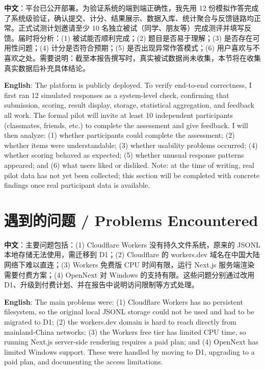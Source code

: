 \documentclass[11pt,a4paper]{ctexart}
\begin{document}
\noindent\textbf{中文}：平台已公开部署。为验证系统的端到端正确性，我先用 12 份模拟作答完成了系统级验证，确认提交、计分、结果展示、数据入库、统计聚合与反馈链路均正常。正式试测计划邀请至少 10 名独立被试（同学、朋友等）完成测评并填写反馈。届时将分析：(1) 被试能否顺利完成；(2) 题目是否易于理解；(3) 是否存在可用性问题；(4) 计分是否符合预期；(5) 是否出现异常作答模式；(6) 用户喜欢与不喜欢之处。需要说明：截至本报告撰写时，真实被试数据尚未收集，本节将在收集真实数据后补充具体结论。

\medskip

\noindent\textbf{English}: The platform is publicly deployed. To verify end-to-end correctness, I first ran 12 simulated responses as a system-level check, confirming that submission, scoring, result display, storage, statistical aggregation, and feedback all work. The formal pilot will invite at least 10 independent participants (classmates, friends, etc.) to complete the assessment and give feedback. I will then analyze: (1) whether participants could complete the assessment; (2) whether items were understandable; (3) whether usability problems occurred; (4) whether scoring behaved as expected; (5) whether unusual response patterns appeared; and (6) what users liked or disliked. Note: at the time of writing, real pilot data has not yet been collected; this section will be completed with concrete findings once real participant data is available.

\section{遇到的问题 / Problems Encountered}

\noindent\textbf{中文}：主要问题包括：(1) Cloudflare Workers 没有持久文件系统，原来的 JSONL 本地存储无法使用，需迁移到 D1；(2) Cloudflare 的 workers.dev 域名在中国大陆网络下难以直连；(3) Workers 免费版 CPU 时间有限，运行 Next.js 服务端渲染需要付费方案；(4) OpenNext 对 Windows 的支持有限。这些问题分别通过改用 D1、升级到付费计划、并在报告中说明访问限制等方式处理。

\medskip

\noindent\textbf{English}: The main problems were: (1) Cloudflare Workers has no persistent filesystem, so the original local JSONL storage could not be used and had to be migrated to D1; (2) the workers.dev domain is hard to reach directly from mainland-China networks; (3) the Workers free tier has limited CPU time, so running Next.js server-side rendering requires a paid plan; and (4) OpenNext has limited Windows support. These were handled by moving to D1, upgrading to a paid plan, and documenting the access limitations.
\end{document}
